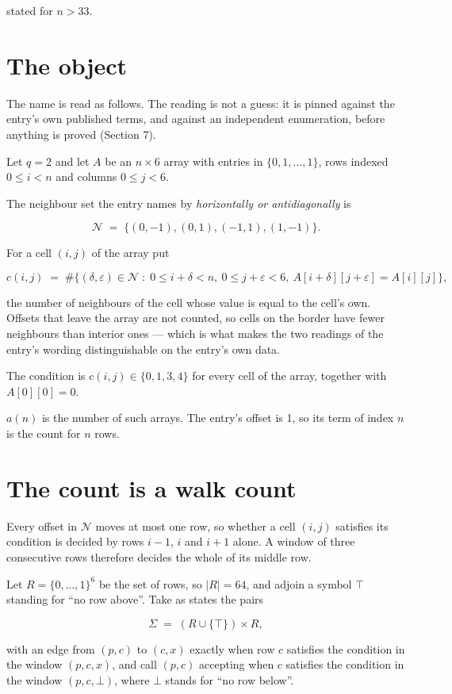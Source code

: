 \documentclass[11pt]{article}
\theoremstyle{definition}
\begin{document}
stated for $n > 33$.

\section{The object}

The name is read as follows. The reading is not a guess: it is pinned against the entry's own published terms, and against an independent enumeration, before anything is proved (Section 7).

Let $q = 2$ and let $A$ be an $n \times 6$ array with entries in $\{0,1,\dots,1\}$, rows indexed $0 \le i < n$ and columns $0 \le j < 6$.

The neighbour set the entry names by {\itshape horizontally or antidiagonally} is

\[\mathcal{N} \;=\; \{(0,-1), (0,1), (-1,1), (1,-1)\}.\]

For a cell $(i,j)$ of the array put

\[c(i,j) \;=\; \#\bigl\{(\delta,\varepsilon)\in\mathcal{N} \;:\; 0\le i+\delta<n,\ 0\le j+\varepsilon<6,\ A[i+\delta][j+\varepsilon] = A[i][j]\bigr\},\]

the number of neighbours of the cell whose value is equal to the cell's own. Offsets that leave the array are not counted, so cells on the border have fewer neighbours than interior ones --- which is what makes the two readings of the entry's wording distinguishable on the entry's own data.

The condition is $c(i,j) \in \{0, 1, 3, 4\}$ for every cell of the array, together with $A[0][0]=0$.

$a(n)$ is the number of such arrays. The entry's offset is 1, so its term of index $n$ is the count for $n$ rows.

\section{The count is a walk count}

Every offset in $\mathcal{N}$ moves at most one row, so whether a cell $(i,j)$ satisfies its condition is decided by rows $i-1$, $i$ and $i+1$ alone. A window of three consecutive rows therefore decides the whole of its middle row.

Let $R = \{0,\dots,1\}^{6}$ be the set of rows, so $|R| = 64$, and adjoin a symbol $\top$ standing for ``no row above''. Take as states the pairs

\[\Sigma \;=\; (R \cup \{\top\}) \times R,\]

with an edge from $(p,c)$ to $(c,x)$ exactly when row $c$ satisfies the condition in the window $(p,c,x)$, and call $(p,c)$ accepting when $c$ satisfies the condition in the window $(p,c,\bot)$, where $\bot$ stands for ``no row below''.
\end{document}
